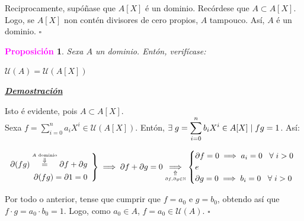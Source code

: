 \documentclass[twoside]{report}
\newcommand{\magbf}[1]{\textcolor{magenta}{\textbf{#1}}} %
\theoremstyle{mystyle}
\newtheorem{prop}{\magbf{Proposición}}[chapter]
\newenvironment{proposition}
{\begin{mdframed}[linecolor = magenta,backgroundcolor = classicrose, linewidth = 2mm]\begin{prop}}
{\end{prop}\end{mdframed}}
\begin{document}
\noindent {} Reciprocamente, supóñase que $A[X]$ é un dominio. Recórdese que $A \subset A[X]$. Logo, se $A[X]$ non contén divisores de cero propios, $A$ tampouco. Así, $A$ é un dominio. $\square$\\

\begin{proposition} \label{prop2.19}
Sexa $A$ un dominio. Entón, verifícase:
\begin{center}
    $\mathcal{U}(A) = \mathcal{U}(A[X])$  
\end{center}
\end{proposition}

\vspace{2mm}

\noindent \textbf{\textit{\underline{Demostración}}}

\vspace{2mm}

\noindent {} Isto é evidente, pois $A \subset A[X]$.\\

\noindent {} Sexa $f = \displaystyle \sum_{i = 0}^{n}{a_{i}X^{i}} \in \mathcal{U}(A[X])$. Entón, $\exists \hspace{1mm} g = \displaystyle \sum_{i = 0}^{n}{b_{i}X^{i}} \in A[X] \hspace{1mm} | \hspace{1mm} fg = 1$. Así:

    \[ 
    \left. \begin{array}{r} 
    \partial (fg) \overset{\overset{A \text{ dominio}}{\Downarrow}}{=} \partial f + \partial g  \\[1ex]
    \partial (fg) = \partial 1 = 0
    \end{array} \right\} 
    \implies \partial f + \partial g = 0 \underset{\underset{\partial f, \partial g \in \mathbb{N}}{\Uparrow}}{\implies} 
    \begin{cases}
    \partial f = 0 \implies a_{i} = 0 \hspace{3mm} \forall \hspace{1mm} i > 0\\
    e\\
    \partial g = 0 \implies b_{i} = 0 \hspace{3mm} \forall \hspace{1mm} i > 0
    \end{cases}
    \]
    
\noindent Por todo o anterior, tense que cumprir que $f = a_{0}$ e $g = b_{0}$, obtendo así que $f \cdot g = a_{0} \cdot b_{0} = 1$. Logo, como $a_{0} \in A$, $f = a_{0} \in \mathcal{U}(A)$. $\square$\\
\end{document}
